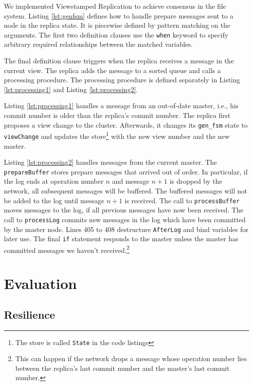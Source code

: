 \documentclass[10pt,letter]{article}
\begin{document}
We implemented Viewstamped Replication\cite{liskov2012viewstamped} to achieve
consensus in the file system. Listing \ref{lst:genfsm} defines how to handle
prepare messages sent to a node in the replica state. It is piecewise defined by
pattern matching on the arguments. The first two definition clauses use the
\lstinline!when! keyword to specify arbitrary required relationships between the
matched variables.

The final definition clause triggers when the replica receives a message in the
current view. The replica adds the message to a sorted queue and calls a
processing procedure. The processing procedure is defined separately in Listing
\ref{lst:processing1} and Listing \ref{lst:processing2}.

Listing \ref{lst:processing1} handles a message from an out-of-date master,
i.e., his commit number is older than the replica's commit number. The replica
first proposes a view change to the cluster. Afterwards, it changes its
\texttt{gen\_fsm} state to \lstinline!viewChange! and updates the
store\footnote{The store is called \lstinline!State! in the code listings} with
the new view number and the new master.

Listing \ref{lst:processing2} handles messages from the current master. The
\lstinline!prepareBuffer! stores prepare messages that arrived out of order. In
particular, if the log ends at operation number $n$ and message $n+1$ is dropped
by the network, all subsequent messages will be buffered. The buffered messages
will not be added to the log until message $n+1$ is received. The call to
\lstinline!processBuffer! moves messages to the log, if all previous messages
have now been received. The call to \lstinline!processLog! commits new messages
in the log which have been committed by the master node. Lines 405 to 408
destructure \lstinline!AfterLog! and bind variables for later use. The final
\lstinline!if! statement responds to the master unless the master has committed
messages we haven't received.\footnote{This can happen if the network drops a message whose
  operation number lies between the replica's last commit number and the
  master's last commit number.}

\section{Evaluation}

\subsection{Resilience}
\end{document}

